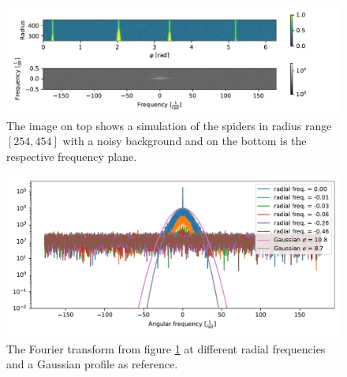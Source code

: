 \begin{figure}[H]
	\centering
		\includegraphics[width=1.1\textwidth]{pics/simulated_spider_noise.pdf}
		\caption{The image on top shows a simulation of the spiders in radius range $[254, 454]$ with a noisy background and on the bottom is the respective frequency plane.}
		\label{fig:simulated_spider_noise}
\end{figure}
\begin{figure}[H]
	\centering
		\includegraphics[width=1.0\textwidth]{pics/simspi_noise_angularfreq.pdf}
	\caption{The Fourier transform from figure \ref{fig:simulated_spider_noise} at different radial frequencies and a Gaussian profile as reference.}
\label{fig:simspi_noise_angularfreq}
\end{figure}


